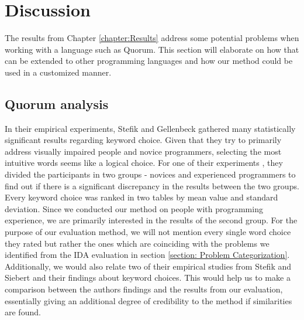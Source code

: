 \chapter{Discussion}
The results from Chapter \ref{chapter:Results} address some potential problems when working with a language such as Quorum. This section will elaborate on how that can be extended to other programming languages and how our method could be used in a customized manner.

\section{Quorum analysis}
In their empirical experiments, Stefik and Gellenbeck \cite{EmpStudiesonStimuli} gathered many statistically significant results regarding keyword choice. Given that they try to primarily address visually impaired people and novice programmers, selecting the most intuitive words seems like a logical choice. For one of their  experiments \cite{EmpStudiesonStimuli}, they divided the participants in two groups - novices and experienced programmers to find out if there is a significant discrepancy in the results between the two groups. Every keyword choice was ranked in two tables by mean value and standard deviation. Since we conducted our method on people with programming experience, we are primarily interested in the results of the second group. For the purpose of our evaluation method, we will not mention every single word choice they rated but rather the ones which are coinciding with the problems we identified from the IDA evaluation in section \ref{section: Problem Categorization}. Additionally, we would also relate two of their empirical studies from Stefik and Siebert \cite{Empiricalinvestigation} and their findings about keyword choices. This would help us to make a comparison between the authors findings and the results from our evaluation, essentially giving an additional degree of credibility to the method if similarities are found.

